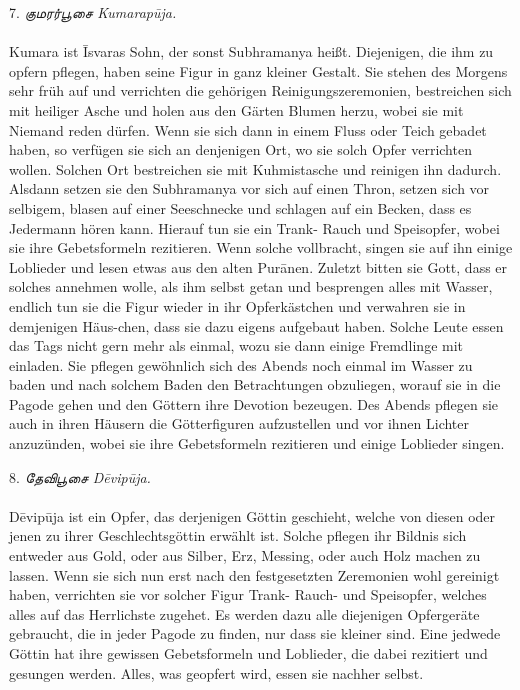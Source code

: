 \documentclass{article}
\newcommand{\TamilText}[1]{\texttamil{#1}}
\newcommand{\tam}[1]{\TamilText{#1}}
\begin{document}
\begin{center}
7. \emph{\tam{குமரர்பூசை} Kumarap\={u}ja.}
\end{center}
\paragraph{}
Kumara ist \={I}svaras Sohn, der sonst Subhramanya heißt. Diejenigen, die ihm zu opfern pflegen, haben seine Figur in ganz kleiner Gestalt. Sie stehen des Morgens sehr früh auf und verrichten die gehörigen Reinigungszeremonien, bestreichen sich mit heiliger Asche und holen aus den Gärten Blumen herzu, wobei sie mit Niemand reden dürfen. Wenn sie sich dann in einem Fluss oder Teich gebadet haben, so verfügen sie sich an denjenigen Ort, wo sie solch Opfer verrichten wollen. Solchen Ort bestreichen sie mit Kuhmistasche und reinigen ihn dadurch. Alsdann setzen sie den Subhramanya vor sich auf einen Thron, setzen sich vor selbigem, blasen auf einer Seeschnecke und schlagen auf ein Becken, dass es Jedermann hören kann. Hierauf tun sie ein Trank- Rauch und Speisopfer, wobei sie ihre Gebetsformeln rezitieren. Wenn solche vollbracht, singen sie auf ihn einige Loblieder und lesen etwas aus den alten Pur\={a}nen. Zuletzt bitten sie Gott, dass er solches annehmen wolle, als ihm selbst getan und besprengen alles mit Wasser, endlich tun sie die Figur wieder in ihr Opferkästchen und verwahren sie in demjenigen Häus-chen, dass sie dazu eigens aufgebaut haben. Solche Leute essen das Tags nicht gern mehr als einmal, wozu sie dann einige Fremdlinge mit einladen. Sie pflegen gewöhnlich sich des Abends noch einmal im Wasser zu baden und nach solchem Baden den Betrachtungen obzuliegen, worauf sie in die Pagode gehen und den Göttern ihre Devotion bezeugen. Des Abends pflegen sie auch in ihren Häusern die Götterfiguren aufzustellen und vor ihnen Lichter anzuzünden, wobei sie ihre Gebetsformeln rezitieren und einige Loblieder singen.

\begin{center}
8. \emph{\tam{தேவிபூசை} D\={e}vip\={u}ja.}
\end{center}
\paragraph{}
D\={e}vip\={u}ja ist ein Opfer, das derjenigen Göttin geschieht, welche von diesen oder jenen zu ihrer Geschlechtsgöttin erwählt ist. Solche pflegen ihr Bildnis sich entweder aus Gold, oder aus Silber, Erz, Messing, oder auch Holz machen zu lassen. Wenn sie sich nun erst nach den festgesetzten Zeremonien wohl gereinigt haben, verrichten sie vor solcher Figur Trank- Rauch- und Speisopfer, welches alles auf das Herrlichste zugehet. Es werden dazu alle diejenigen Opfergeräte gebraucht, die in jeder Pagode zu finden, nur dass sie kleiner sind. Eine jedwede Göttin hat ihre gewissen Gebetsformeln und Loblieder, die dabei rezitiert und gesungen werden. Alles, was geopfert wird, essen sie nachher selbst.
\end{document}
